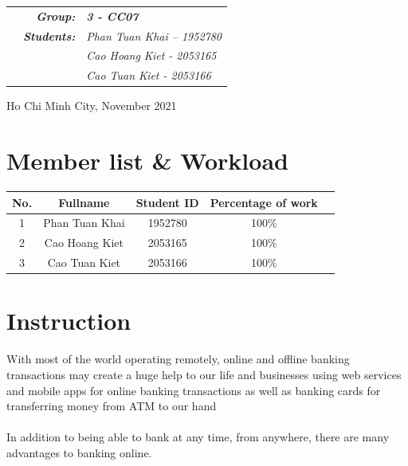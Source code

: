 \documentclass[12pt,a4paper]{article}
\begin{document}
\begin{titlepage}
\begin{center}
\begin{table}[h]
\begin{tabular}{rrl}
\hspace{3.8 cm} & \textit{\textbf{Group:}} & \textit{\textbf{3 - CC07}}\\
\hspace{3.8 cm} & \textit{\textbf{Students:}} & \textit{Phan Tuan Khai – 1952780}\\
\hspace{3.8 cm} & & \textit{Cao Hoang Kiet - 2053165}\\
\hspace{3.8 cm} & & \textit{Cao Tuan Kiet - 2053166}\\
\end{tabular}
\end{table}
\vspace{1cm}

\begin{center}
{\footnotesize Ho Chi Minh City, November 2021}
\end{center}
    \vfill
    \vspace{2cm}
    {\large} %
  \end{center}
\end{titlepage}

\bigskip

\newpage
\hspace{2 cm}
\tableofcontents
\newpage
\newpage

\section{Member list \& Workload}

\begin{center}
\begin{tabular}{|c|c|c|c|c|}
\hline
\textbf{No.} & \textbf{Fullname} & \textbf{Student ID} &  \textbf{Percentage of work}\\
\hline 
{1} & {Phan Tuan Khai} & {1952780} &  {100\%}\\
\hline 
{2} & {Cao Hoang Kiet} & {2053165} & {100\%}\\
\hline
{3} & {Cao Tuan Kiet} & {2053166} &  {100\%}\\
\hline
\end{tabular}
\end{center}

\section {Instruction}
With most of the world operating remotely, online and offline banking transactions may
create a huge help to our life and businesses using web services and mobile apps for online banking transactions as well as banking cards for transferring money from ATM to our hand\\\\
\indent In addition to being able to bank at any time, from anywhere, there are many advantages
to banking online.
\end{document}
